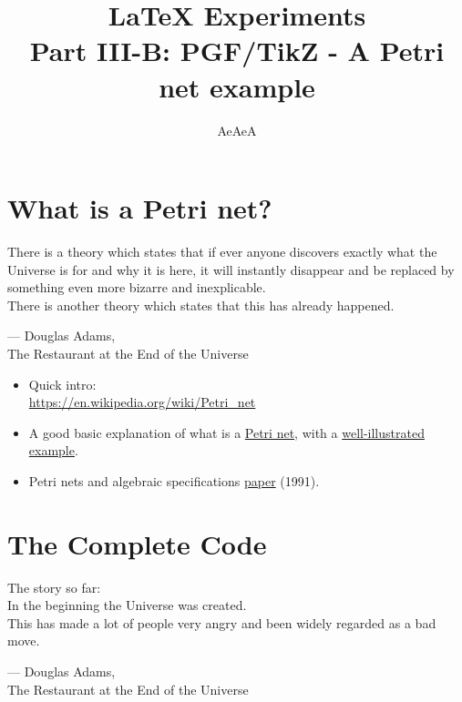 \documentclass{article}
\title{\LaTeX{} Experiments\\ Part III-B: PGF/TikZ - A Petri net example}
\author{AeAeA}
\begin{document}
\maketitle

\newpage
\section{What is a Petri net?}

\epigraph
{There is a theory which states that if ever anyone discovers exactly what the 
Universe is for and why it is here, it will instantly disappear and be replaced 
by something even more bizarre and inexplicable. \\
\hfill \break
There is another theory which states that this has already happened.}
{--- \textup{Douglas Adams},\\ The Restaurant at the End of the Universe}

\begin{itemize}

    \item Quick intro:\\ 
          \url{https://en.wikipedia.org/wiki/Petri_net}
    
    \item A good basic explanation of what is a 
          \href{https://www.techfak.uni-bielefeld.de/~mchen/BioPNML/Intro/pnfaq.html}
          {Petri net}, with a 
          \href{https://www.techfak.uni-bielefeld.de/~mchen/BioPNML/Intro/MRPN.html}
          {well-illustrated example}.

    \item Petri nets and algebraic specifications 
          \href{https://www.sciencedirect.com/science/article/pii/030439759190203E?via%3Dihub}
          {paper} (1991).

\end{itemize}

\newpage
\section{The Complete Code}

\epigraph
{The story so far: \\
\hfill \break
In the beginning the Universe was created.\\
\hfill \break
This has made a lot of people very angry and been widely regarded as a bad move.}
{--- \textup{Douglas Adams},\\ The Restaurant at the End of the Universe}
\end{document}
